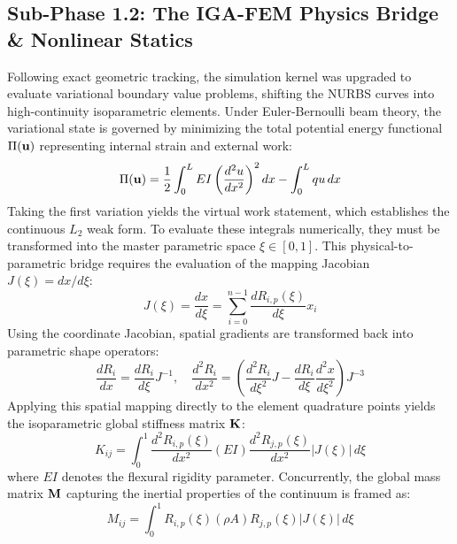 \subsection{Sub-Phase 1.2: The IGA-FEM Physics Bridge \& Nonlinear Statics}
\label{subsec:nonlinear_rec}

Following exact geometric tracking, the simulation kernel was upgraded to evaluate variational boundary value problems, shifting the NURBS curves into high-continuity isoparametric elements. Under Euler-Bernoulli beam theory, the variational state is governed by minimizing the total potential energy functional $\Pi(\mathbf{u})$ representing internal strain and external work:
\begin{equation}
\Pi(\mathbf{u}) = \frac{1}{2} \int_{0}^{L} EI \left( \frac{d^2 u}{dx^2} \right)^2 dx - \int_{0}^{L} q u \, dx
\end{equation}
Taking the first variation yields the virtual work statement, which establishes the continuous $L_2$ weak form. To evaluate these integrals numerically, they must be transformed into the master parametric space $\xi \in [0, 1]$. This physical-to-parametric bridge requires the evaluation of the mapping Jacobian $J(\xi) = dx/d\xi$:
\begin{equation}
J(\xi) = \frac{dx}{d\xi} = \sum_{i=0}^{n-1} \frac{d R_{i,p}(\xi)}{d\xi} x_i
\end{equation}
Using the coordinate Jacobian, spatial gradients are transformed back into parametric shape operators:
\begin{equation}
\frac{d R_i}{dx} = \frac{d R_i}{d\xi} J^{-1}, \quad \frac{d^2 R_i}{dx^2} = \left( \frac{d^2 R_i}{d\xi^2} J - \frac{d R_i}{d\xi} \frac{d^2 x}{d\xi^2} \right) J^{-3}
\end{equation}
Applying this spatial mapping directly to the element quadrature points yields the isoparametric global stiffness matrix $\mathbf{K}$:
\begin{equation}
K_{ij} = \int_{0}^{1} \frac{d^2 R_{i,p}(\xi)}{dx^2} (EI) \frac{d^2 R_{j,p}(\xi)}{dx^2} |J(\xi)| \, d\xi
\end{equation}
where $EI$ denotes the flexural rigidity parameter. Concurrently, the global mass matrix $\mathbf{M}$ capturing the inertial properties of the continuum is framed as:
\begin{equation}
M_{ij} = \int_{0}^{1} R_{i,p}(\xi) (\rho A) R_{j,p}(\xi) |J(\xi)| \, d\xi
\end{equation}


